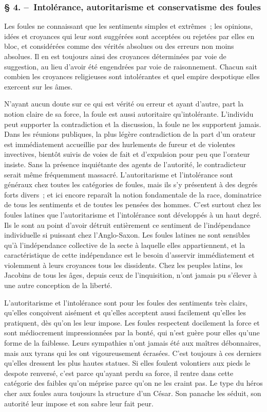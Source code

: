 \documentclass[french,twoside]{book} %
\begin{document}
\subsubsection[{§ 4. – Intolérance, autoritarisme et conservatisme des foules}]{§ 4. – Intolérance, autoritarisme et conservatisme des foules}
\noindent Les foules ne connaissant que les sentiments simples et extrêmes ; les opinions, idées et croyances qui leur sont suggérées sont acceptées ou rejetées par elles en bloc, et considérées comme des vérités absolues ou des erreurs non moins absolues. Il en est toujours ainsi des croyances déterminées par voie de suggestion, au lieu d’avoir été engendrées par voie de raisonnement. Chacun sait combien les croyances reli­gieuses sont intolérantes et quel empire despotique elles exercent sur les âmes.\par
N’ayant aucun doute sur ce qui est vérité ou erreur et ayant d’autre, part la notion claire de sa force, la foule est aussi autoritaire qu’intolérante. L’individu peut sup­porter la contradiction et la discussion, la foule ne les supportent jamais. Dans les réunions publiques, la plus légère contradiction de la part d’un orateur est immédiate­ment accueillie par des hurlements de fureur et de violentes invectives, bientôt suivis de voies de fait et d’expulsion pour peu que l’orateur insiste. Sans la présence inquié­tante des agents de l’autorité, le contradicteur serait même fréquemment massacré. L’autoritarisme et l’intolérance sont généraux chez toutes les catégories de foules, mais ils s’y présentent à des degrés forts divers ; et ici encore reparaît la notion fondamentale de la race, dominatrice de tous les sentiments et de toutes les pensées des hommes. C’est surtout chez les foules latines que l’autoritarisme et l’intolérance sont développés à un haut degré. Ils le sont au point d’avoir détruit entièrement ce sentiment de l’indépendance individuelle si puissant chez l’Anglo-Saxon. Les foules latines ne sont sensibles qu’à l’indépendance collective de la secte à laquelle elles appartiennent, et la caractéristique de cette indépendance est le besoin d’asservir immédiatement et violemment à leurs croyances tous les dissidents. Chez les peuples latins, les Jacobins de tous les âges, depuis ceux de l’inquisition, n’ont jamais pu s’élever à une autre conception de la liberté.\par
L’autoritarisme et l’intolérance sont pour les foules des sentiments très clairs, qu’elles conçoivent aisément et qu’elles acceptent aussi facilement qu’elles les prati­quent, dès qu’on les leur impose. Les foules respectent docilement la force et sont médiocrement impressionnées par la bonté, qui n’est guère pour elles qu’une forme de la faiblesse. Leurs sympathies n’ont jamais été aux maîtres débonnaires, mais aux tyrans qui les ont vigoureusement écrasées. C’est toujours à ces derniers qu’elles dres­sent les plus hautes statues. Si elles foulent volontiers aux pieds le despote renversé, c’est parce qu’ayant perdu sa force, il rentre dans cette catégorie des faibles qu’on méprise parce qu’on ne les craint pas. Le type du héros cher aux foules aura toujours la structure d’un César. Son panache les séduit, son autorité leur impose et son sabre leur fait peur.\par
\end{document}
